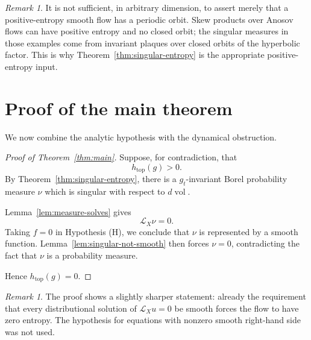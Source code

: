 \documentclass[11pt]{article}
\theoremstyle{definition}
\theoremstyle{remark}
\newtheorem{remark}[theorem]{Remark}
\newcommand{\vol}{\operatorname{vol}}
\newcommand{\htop}{h_{\mathrm{top}}}
\begin{document}
\begin{remark}
It is not sufficient, in arbitrary dimension, to assert merely that a
positive-entropy smooth flow has a periodic orbit.  Skew products over
Anosov flows can have positive entropy and no closed orbit; the
singular measures in those examples come from invariant plaques over
closed orbits of the hyperbolic factor.  This is why
Theorem~\ref{thm:singular-entropy} is the appropriate positive-entropy
input.
\end{remark}

\section{Proof of the main theorem}

We now combine the analytic hypothesis with the dynamical obstruction.

\begin{proof}[Proof of Theorem~\ref{thm:main}]
Suppose, for contradiction, that
\[
\htop(g)>0.
\]
By Theorem~\ref{thm:singular-entropy}, there is a \(g_t\)-invariant
Borel probability measure \(\nu\) which is singular with respect to
\(d\vol\).

Lemma~\ref{lem:measure-solves} gives
\[
\mathcal L_X\nu=0.
\]
Taking \(f=0\) in Hypothesis (H), we conclude that \(\nu\) is
represented by a smooth function.  Lemma~\ref{lem:singular-not-smooth}
then forces \(\nu=0\), contradicting the fact that \(\nu\) is a
probability measure.

Hence \(\htop(g)=0\).
\end{proof}

\begin{remark}
The proof shows a slightly sharper statement: already the requirement
that every distributional solution of \(\mathcal L_Xu=0\) be smooth
forces the flow to have zero entropy.  The hypothesis for equations
with nonzero smooth right-hand side was not used.
\end{remark}
\end{document}
